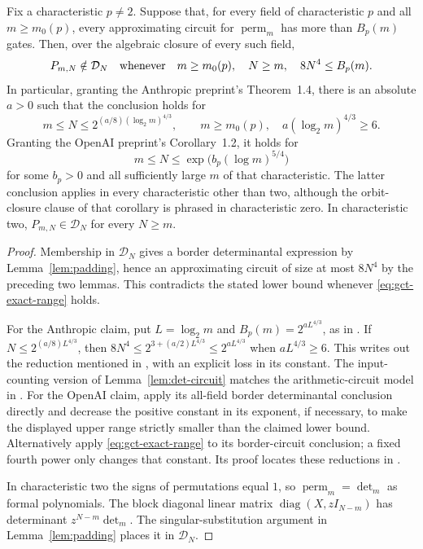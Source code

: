 \begin{theorem}
\label{thm:conditional-gct}
Fix a characteristic $p\ne2$.  Suppose that, for every field of
characteristic $p$ and all $m\geq m_0(p)$, every approximating
circuit for $\operatorname{perm}_m$ has more than $B_p(m)$ gates.
Then, over the algebraic closure of every such field,
\begin{equation}\label{eq:gct-exact-range}
 P_{m,N}\notin\mathcal D_N
 \quad\hbox{whenever}\quad
 m\geq m_0(p),\quad N\geq m,\quad 8N^4\leq B_p(m).
\end{equation}
In particular, granting the Anthropic preprint's Theorem~1.4,
there is an absolute $a>0$ such that the conclusion holds for
\[
 m\leq N\leq
 2^{(a/8)(\log_2m)^{4/3}},
 \qquad
 m\geq m_0(p),\quad a(\log_2m)^{4/3}\geq6.
\]
Granting the OpenAI preprint's Corollary~1.2, it holds for
\[
 m\leq N\leq\exp\bigl(b_p(\log m)^{5/4}\bigr)
\]
for some $b_p>0$ and all sufficiently large $m$ of that
characteristic.  The latter conclusion applies in every
characteristic other than two, although the orbit-closure clause
of that corollary is phrased in characteristic zero.
In characteristic two, $P_{m,N}\in\mathcal D_N$ for every $N\geq m$.
\end{theorem}

\begin{proof}
Membership in $\mathcal D_N$ gives a border determinantal
expression by Lemma~\ref{lem:padding}, hence an approximating
circuit of size at most $8N^4$ by the preceding two lemmas.
This contradicts the stated lower bound whenever
\eqref{eq:gct-exact-range} holds.

For the Anthropic claim, put $L=\log_2m$ and
$B_p(m)=2^{aL^{4/3}}$, as in
\cite[Theorems~1.1 and 1.4, p.~2]{Anthropic2026}.
If $N\leq2^{(a/8)L^{4/3}}$, then
$8N^4\leq2^{3+(a/2)L^{4/3}}\leq2^{aL^{4/3}}$
when $aL^{4/3}\geq6$.  This writes out the reduction mentioned
in \cite[Remark~N.6, p.~64]{Anthropic2026}, with an explicit
loss in its constant.  The input-counting version of
Lemma~\ref{lem:det-circuit} matches the arithmetic-circuit model
in \cite[Section~1.3, pp.~3--4]{Anthropic2026}.
For the OpenAI claim, apply its
all-field border determinantal conclusion directly and decrease
the positive constant in its exponent, if necessary, to make the
displayed upper range strictly smaller than the claimed lower
bound.  Alternatively apply \eqref{eq:gct-exact-range} to its
border-circuit conclusion; a fixed fourth power only changes
that constant.  Its proof locates these reductions in
\cite[Corollary~1.2 and its proof]{OpenAI2026}.

In characteristic two the signs of permutations equal $1$,
so $\operatorname{perm}_m=\det_m$ as formal polynomials.
The block diagonal linear matrix
$\operatorname{diag}(X,zI_{N-m})$ has determinant
$z^{N-m}\det_m$.  The singular-substitution argument in
Lemma~\ref{lem:padding} places it in $\mathcal D_N$.
\end{proof}

